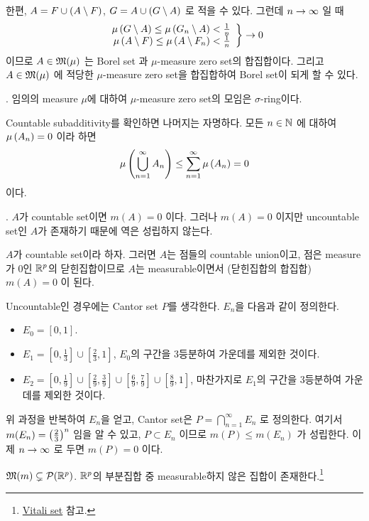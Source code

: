 한편, \(A = F \cup (A \setminus F)\), \(G = A \cup (G \setminus A)\) 로 적을 수 있다. 그런데 \(n \rightarrow \infty\) 일 때
\[
    \left.\begin{array}{r}\mu\left( G \setminus A \right)\leq \mu\left( G_n \setminus A \right) < \frac{1}{n} \\
        \mu\left( A \setminus F \right) \leq \mu\left( A \setminus F_n \right) < \frac{1}{n}\end{array}\right\}
    \rightarrow 0
\]
이므로 \(A \in \mathfrak{M}(\mu)\) 는 Borel set 과 \(\mu\)-measure zero set의 합집합이다. 그리고 \(A \in \mathfrak{M}(\mu)\) 에 적당한 \(\mu\)-measure zero set을 합집합하여 Borel set이 되게 할 수 있다.

\prop. 임의의 measure \(\mu\)에 대하여 \(\mu\)-measure zero set의 모임은 \(\sigma\)-ring이다.

\pf Countable subadditivity를 확인하면 나머지는 자명하다. 모든 \(n\in \mathbb{N}\) 에 대하여 \(\mu\left( A_n \right) = 0\) 이라 하면
\[
    \mu\left( \bigcup_{n=1}^{\infty} A_n \right) \leq \sum_{n=1}^{\infty} \mu\left( A_n \right) = 0
\]
이다.

\prop. \(A\)가 countable set이면 \(m(A) = 0\) 이다. 그러나 \(m(A) = 0\) 이지만 uncountable set인 \(A\)가 존재하기 때문에 역은 성립하지 않는다.

\pf \(A\)가 countable set이라 하자. 그러면 \(A\)는 점들의 countable union이고, 점은 measure가 0인 \(\mathbb{R}^p\)의 닫힌집합이므로 \(A\)는 measurable이면서 (닫힌집합의 합집합) \(m(A) = 0\) 이 된다.

Uncountable인 경우에는 Cantor set \(P\)를 생각한다. \(E_n\)을 다음과 같이 정의한다.
\begin{itemize}
    \item \(E_0 = [0, 1]\).
    \item \(E_1 = \left[0, \frac{1}{3}\right] \cup \left[\frac{2}{3}, 1\right]\), \(E_0\)의 구간을 3등분하여 가운데를 제외한 것이다.
    \item \(E_2 = \left[0, \frac{1}{9}\right] \cup \left[\frac{2}{9}, \frac{3}{9}\right] \cup \left[\frac{6}{9}, \frac{7}{9}\right] \cup \left[\frac{8}{9}, 1\right]\), 마찬가지로 \(E_1\)의 구간을 3등분하여 가운데를 제외한 것이다.
\end{itemize}
위 과정을 반복하여 \(E_n\)을 얻고, Cantor set은 \(P = \bigcap_{n=1}^{\infty} E_n\) 로 정의한다. 여기서 \(m(E_n) = \left( \frac{2}{3} \right)^n\) 임을 알 수 있고, \(P \subset E_n\) 이므로 \(m(P)\leq m(E_n)\) 가 성립한다. 이제 \(n \rightarrow \infty\) 로 두면 \(m(P) = 0\) 이다.

\rmk \(\mathfrak{M}(m) \subsetneq \mathcal{P}(\mathbb{R}^p)\). \(\mathbb{R}^p\)의 부분집합 중 measurable하지 않은 집합이 존재한다.\footnote{\href{https://en.wikipedia.org/wiki/Vitali_set}{Vitali set} 참고.}

